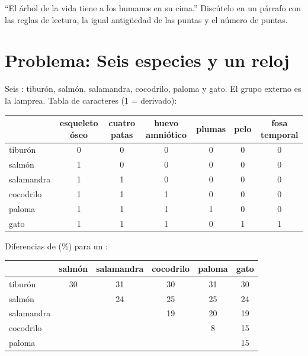 \begin{exercise}[$\star\star\star$]\label{exo:g12:phylogenetic-trees:15}
``El árbol de la vida tiene a los humanos en su cima.'' Discútelo en un
párrafo con las reglas de lectura, la igual antigüedad de las puntas y
el número de puntas.
\end{exercise}

\section{Problema: Seis especies y un reloj}

\begin{problem}
\label{pb:g12:phylogenetic-trees:1}
Seis : tiburón, salmón, salamandra, cocodrilo, paloma y gato.
El grupo externo es la lamprea. Tabla de caracteres (1 = derivado):

\begin{center}
\small
\begin{tabular}{lcccccc}
 & esqueleto óseo & cuatro patas & huevo amniótico & plumas & pelo & fosa temporal \\ \hline
tiburón & 0 & 0 & 0 & 0 & 0 & 0 \\
salmón & 1 & 0 & 0 & 0 & 0 & 0 \\
salamandra & 1 & 1 & 0 & 0 & 0 & 0 \\
cocodrilo & 1 & 1 & 1 & 0 & 0 & 0 \\
paloma & 1 & 1 & 1 & 1 & 0 & 0 \\
gato & 1 & 1 & 1 & 0 & 1 & 1 \\
\end{tabular}
\end{center}

Diferencias de  (\%) para un :

\begin{center}
\begin{tabular}{lccccc}
 & salmón & salamandra & cocodrilo & paloma & gato \\ \hline
tiburón & 30 & 31 & 30 & 31 & 30 \\
salmón & & 24 & 25 & 25 & 24 \\
salamandra & & & 19 & 20 & 19 \\
cocodrilo & & & & 8 & 15 \\
paloma & & & & & 15 \\
\end{tabular}
\end{center}


\end{problem}
